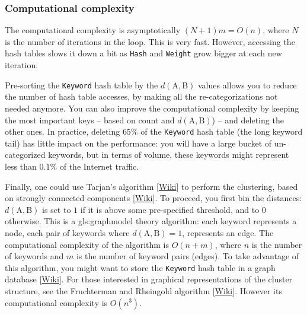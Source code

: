 \documentclass[oneside,10pt]{book}
\begin{document}
\subsubsection{Computational complexity}

The computational complexity is asymptotically $(N+1)m = O(n)$, where $N$ is the number of iterations in the loop. This is very fast. However, accessing the hash tables slows it down a bit  as \texttt{Hash} and \texttt{Weight} grow bigger at each new iteration.

Pre-sorting the \texttt{Keyword} hash table  by the $d(\text{A}, \text{B})$ values allows you to  reduce the number of hash table accesses, by making all the re-categorizations not needed anymore.
You can also improve the computational complexity by keeping the most important keys -- based on count and $d(\text{A},\text{B})$) -- and deleting the other ones. In practice, deleting $65\%$ of the \texttt{Keyword} hash table (the long keyword tail) has  little impact on the performance: you will have a large bucket of un-categorized keywords, but in terms of volume, these keywords might represent less than $0.1\%$ of the Internet traffic.

Finally, one could use \textcolor{index}{Tarjan's  algorithm} [\href{https://en.wikipedia.org/wiki/Tarjan\%27s_strongly_connected_components_algorithm}{Wiki}] to perform the clustering, based on strongly \textcolor{index}{connected components} [\href{https://en.wikipedia.org/wiki/Component_(graph_theory)}{Wiki}]. To proceed, you first bin the distances: 
$d(\text{A}, \text{B})$ is set to $1$ if it is above some pre-specified threshold, and to $0$ otherwise. This is a \gls{gls:graphmodel} theory algorithm: each keyword represents a node, each pair of keywords where $d(\text{A}, \text{B}) = 1$, represents an edge. The computational complexity of the algorithm is $O(n + m)$, where $n$ is the number of keywords and $m$ is the number of keyword pairs (edges). To take advantage of this algorithm, you might want to store the \texttt{Keyword} hash table in a 
\textcolor{index}{graph database} [\href{https://en.wikipedia.org/wiki/Graph_database}{Wiki}]. For those interested in graphical representations of the cluster structure, see the 
\textcolor{index}{Fruchterman and Rheingold algorithm} [\href{https://en.wikipedia.org/wiki/Force-directed_graph_drawing}{Wiki}]. However its computational complexity is $O(n^3)$.  
\end{document}
